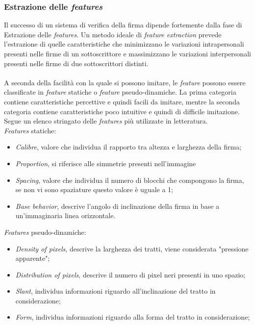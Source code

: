 \subsubsection*{Estrazione delle \emph{features}}
\label{2.1.3.3}
Il successo di un sistema di verifica della firma dipende fortemente dalla fase di Estrazione delle \emph{features}. Un metodo ideale di \emph{feature extraction} prevede l'estrazione di quelle caratteristiche che minimizzano le variazioni intrapersonali presenti nelle firme di un sottoscrittore e massimizzano le variazioni interpersonali presenti nelle firme di due sottoscrittori distinti\cite{2}.\\\\
A seconda della facilità con la quale si possono imitare, le \emph{feature} possono essere classificate in \emph{feature} statiche o \emph{feature} pseudo-dinamiche. La prima categoria contiene caratteristiche percettive e quindi facili da imitare, mentre la seconda categoria contiene caratteristiche poco intuitive e quindi di difficile imitazione\cite{3}.
Segue un elenco stringato delle \emph{features} più utilizzate in letteratura.\\
\emph{Features} statiche:
\begin{itemize}
\item \emph{Calibre}, valore che individua il rapporto tra altezza e larghezza della firma;
\item \emph{Proportion}, si riferisce alle simmetrie presenti nell'immagine
\item \emph{Spacing}, valore che individua il numero di blocchi che compongono la firma, se non vi sono spaziature questo valore è uguale a 1;
\item \emph{Base behavior}, descrive l'angolo di inclinazione della firma in base a un'immaginaria linea orizzontale.
\end{itemize}
\emph{Features} pseudo-dinamiche:
\begin{itemize}
\item \emph{Density of pixels}, descrive la larghezza dei tratti, viene considerata "pressione apparente";
\item \emph{Distribution of pixels}, descrive il numero di pixel neri presenti in uno spazio;
\item \emph{Slant}, individua informazioni riguardo all'inclinazione del tratto in considerazione;
\item \emph{Form}, individua informazioni riguardo alla forma del tratto in considerazione;
\end{itemize}
